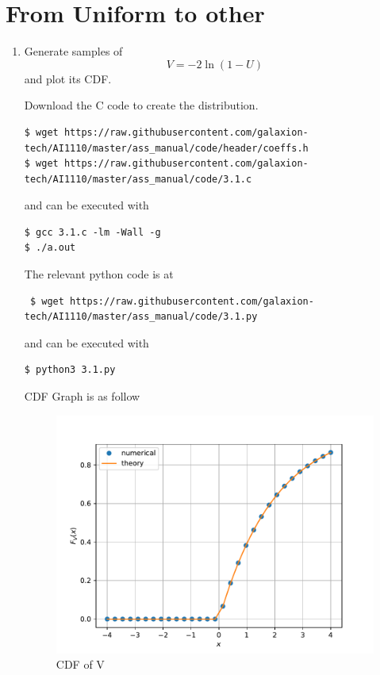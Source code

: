 \documentclass[journal,12pt,twocolumn]{IEEEtran}
\renewcommand\thesection{\arabic{section}}
\begin{document}
\section{From Uniform to other}
\begin{enumerate}[label=\thesection.\arabic*.,ref=\thesection.\theenumi]

\item Generate samples of
\begin{equation}
    V = -2 \ln (1-U)
\end{equation}
and plot its CDF.\\
\solution 

Download the C code to create the distribution.

\begin{lstlisting}
$ wget https://raw.githubusercontent.com/galaxion-tech/AI1110/master/ass_manual/code/header/coeffs.h
$ wget https://raw.githubusercontent.com/galaxion-tech/AI1110/master/ass_manual/code/3.1.c
\end{lstlisting}
and can be executed with
\begin{lstlisting}
$ gcc 3.1.c -lm -Wall -g
$ ./a.out
\end{lstlisting}

The relevant python code is at

\begin{lstlisting}
 $ wget https://raw.githubusercontent.com/galaxion-tech/AI1110/master/ass_manual/code/3.1.py
\end{lstlisting}
and can be executed with
\begin{lstlisting}
$ python3 3.1.py
\end{lstlisting}

CDF Graph is as follow 
\begin{figure}[H]
    \includegraphics[scale=0.6]{./figs/other_cdf}
    \caption{CDF of V}
\end{figure}


\end{enumerate}
\end{document}
